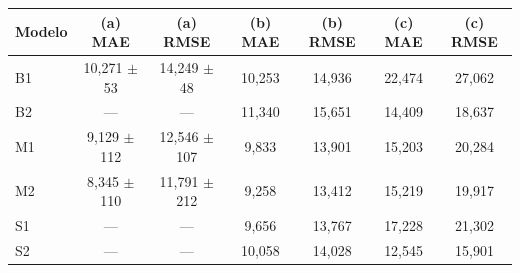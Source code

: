 \begin{tabular}{lcccccc}
\toprule
Modelo & (a) MAE & (a) RMSE & (b) MAE & (b) RMSE & (c) MAE & (c) RMSE \\
\midrule
B1 & 10,271 $\pm$ 53 & 14,249 $\pm$ 48 & 10,253 & 14,936 & 22,474 & 27,062 \\
B2 & --- & --- & 11,340 & 15,651 & 14,409 & 18,637 \\
M1 & 9,129 $\pm$ 112 & 12,546 $\pm$ 107 & 9,833 & 13,901 & 15,203 & 20,284 \\
M2 & 8,345 $\pm$ 110 & 11,791 $\pm$ 212 & 9,258 & 13,412 & 15,219 & 19,917 \\
S1 & --- & --- & 9,656 & 13,767 & 17,228 & 21,302 \\
S2 & --- & --- & 10,058 & 14,028 & 12,545 & 15,901 \\
\bottomrule
\end{tabular}
